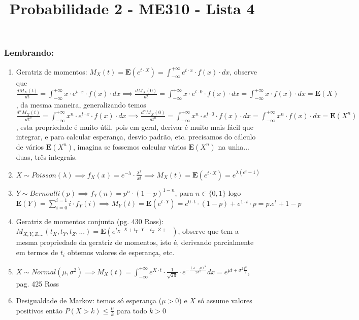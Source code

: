 \documentclass[english]{article}
\begin{document}
\title{Probabilidade 2 - ME310 - Lista 4}

\maketitle

\subsubsection*{Lembrando:}
\begin{enumerate}
\item Geratriz de momentos: $M_{X}(t)=\mathbf{E}(e^{t\cdot X})=\int_{-\infty}^{+\infty}e^{t\cdot x}\cdot f(x)\cdot dx$,
observe que $\frac{dM_{X}(t)}{dt}=\int_{-\infty}^{+\infty}x\cdot e^{t\cdot x}\cdot f(x)\cdot dx\implies\frac{dM_{X}(0)}{dt}=\int_{-\infty}^{+\infty}x\cdot e^{t\cdot0}\cdot f(x)\cdot dx=\int_{-\infty}^{+\infty}x\cdot f(x)\cdot dx=\mathbf{E}(X)$,
da mesma maneira, generalizando temos $\frac{d^{n}M_{X}(t)}{dt^{n}}=\int_{-\infty}^{+\infty}x^{n}\cdot e^{t\cdot x}\cdot f(x)\cdot dx\implies\frac{d^{n}M_{X}(0)}{dt^{n}}=\int_{-\infty}^{+\infty}x^{n}\cdot e^{t\cdot0}\cdot f(x)\cdot dx=\int_{-\infty}^{+\infty}x^{n}\cdot f(x)\cdot dx=\mathbf{E}(X^{n})$,
esta propriedade é muito útil, pois em geral, derivar é muito mais
fácil que integrar, e para calcular esperança, desvio padrão, etc.
precisamos do cálculo de vários $\mathbf{E}(X^{n})$, imagina se fossemos
calcular vários $\mathbf{E}(X^{n})$ na unha... duas, três integrais.
\item $X\sim Poisson(\lambda)\implies f_{X}(x)=e^{-\lambda}\cdot\frac{\lambda^{x}}{x!}\implies M_{X}(t)=\mathbf{E}(e^{t\cdot X})=e^{\lambda(e^{t}-1)}$
\item $Y\sim Bernoulli(p)\implies f_{Y}(n)=p^{n}\cdot(1-p)^{1-n}$, para
$n\in\{0,1\}$ logo $\mathbf{E}(Y)=\sum_{i=0}^{i=1}i\cdot f_{Y}(i)\implies M_{Y}(t)=\mathbf{E}(e^{t\cdot Y})=e^{0\cdot t}\cdot(1-p)+e^{1\cdot t}\cdot p=p.e^{t}+1-p$
\item Geratriz de momentos conjunta (pg. 430 Ross): $M_{X,Y,Z....}(t_{X},t_{Y},t_{Z},...)=\mathbf{E}(e^{t_{X}\cdot X+t_{Y}\cdot Y+t_{Z}\cdot Z+...})$,
observe que tem a mesma propriedade da geratriz de momentos, isto
é, derivando parcialmente em termos de $t_{i}$ obtemos valores de
esperança, etc.
\item $X\sim Normal(\mu,\sigma^{2})\implies M_{X}(t)=\int_{-\infty}^{+\infty}e^{X\cdot t}\cdot\frac{1}{\sqrt{2\pi}}\cdot e^{-\frac{(x-\mu)^{2}}{2\sigma^{2}}}dx=e^{\mu t+\sigma^{2}\frac{t^{2}}{2}}$,
pag. 425 Ross
\item Desigualdade de Markov: temos só esperança ($\mu>0$) e $X$ só assume
valores positivos então $P(X>k)\le\frac{\mu}{k}$ para todo $k>0$


\end{enumerate}
\end{document}
